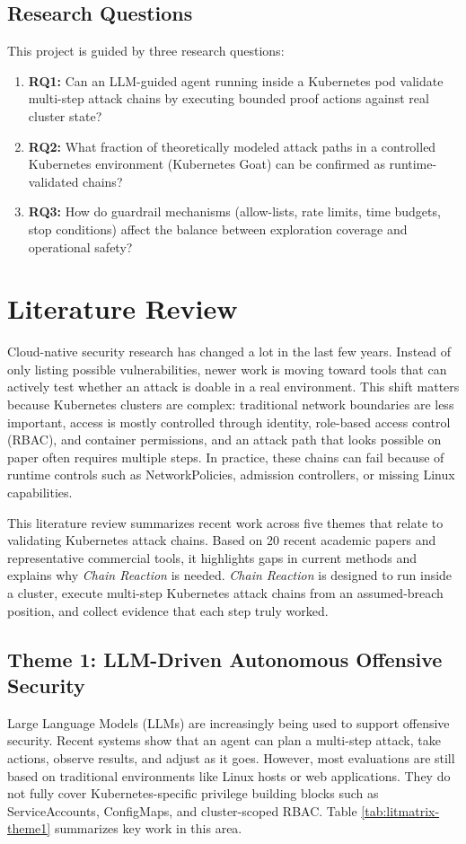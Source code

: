 \documentclass[conference]{IEEEtran}
\begin{document}
\subsection{Research Questions}
This project is guided by three research questions:
\begin{enumerate}
    \item \textbf{RQ1:} Can an LLM-guided agent running inside a Kubernetes pod validate multi-step attack chains by executing bounded proof actions against real cluster state?
    \item \textbf{RQ2:} What fraction of theoretically modeled attack paths in a controlled Kubernetes environment (Kubernetes Goat) can be confirmed as runtime-validated chains?
    \item \textbf{RQ3:} How do guardrail mechanisms (allow-lists, rate limits, time budgets, stop conditions) affect the balance between exploration coverage and operational safety?
\end{enumerate}

\section{Literature Review}

Cloud-native security research has changed a lot in the last few years. Instead of only listing possible vulnerabilities, newer work is moving toward tools that can actively test whether an attack is doable in a real environment. This shift matters because Kubernetes clusters are complex: traditional network boundaries are less important, access is mostly controlled through identity, role-based access control (RBAC), and container permissions, and an attack path that looks possible on paper often requires multiple steps. In practice, these chains can fail because of runtime controls such as NetworkPolicies, admission controllers, or missing Linux capabilities.

This literature review summarizes recent work across five themes that relate to validating Kubernetes attack chains. Based on 20 recent academic papers and representative commercial tools, it highlights gaps in current methods and explains why \emph{Chain Reaction} is needed. \emph{Chain Reaction} is designed to run inside a cluster, execute multi-step Kubernetes attack chains from an assumed-breach position, and collect evidence that each step truly worked.

\subsection{Theme 1: LLM-Driven Autonomous Offensive Security}
Large Language Models (LLMs) are increasingly being used to support offensive security. Recent systems show that an agent can plan a multi-step attack, take actions, observe results, and adjust as it goes. However, most evaluations are still based on traditional environments like Linux hosts or web applications. They do not fully cover Kubernetes-specific privilege building blocks such as ServiceAccounts, ConfigMaps, and cluster-scoped RBAC. Table \ref{tab:litmatrix-theme1} summarizes key work in this area.
\end{document}
